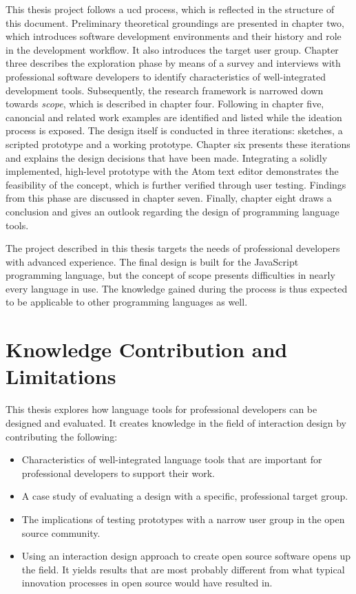 This thesis project follows a \ac{ucd} process, which is reflected in
the structure of this document. Preliminary theoretical groundings are
presented in chapter two, which introduces software development
environments and their history and role in the development workflow. It
also introduces the target user group. Chapter three describes the
exploration phase by means of a survey and interviews with professional
software developers to identify characteristics of well-integrated
development tools. Subsequently, the research framework is narrowed down
towards \emph{scope}, which is described in chapter four. Following in
chapter five, canoncial and related work examples are identified and
listed while the ideation process is exposed. The design itself is
conducted in three iterations: sketches, a scripted prototype and a
working prototype. Chapter six presents these iterations and explains
the design decisions that have been made. Integrating a solidly
implemented, high-level prototype with the Atom text editor demonstrates
the feasibility of the concept, which is further verified through user
testing. Findings from this phase are discussed in chapter seven.
Finally, chapter eight draws a conclusion and gives an outlook regarding
the design of programming language tools.

The project described in this thesis targets the needs of professional
developers with advanced experience. The final design is built for the
JavaScript programming language, but the concept of scope presents
difficulties in nearly every language in use. The knowledge gained
during the process is thus expected to be applicable to other
programming languages as well.

\section{Knowledge Contribution and
Limitations}\label{knowledge-contribution-and-limitations}

This thesis explores how language tools for professional developers can
be designed and evaluated. It creates knowledge in the field of
interaction design by contributing the following:

\begin{itemize}
\itemsep1pt\parskip0pt
\item
  Characteristics of well-integrated language tools that are important
  for professional developers to support their work.
\item
  A case study of evaluating a design with a specific, professional
  target group.
\item
  The implications of testing prototypes with a narrow user group in the
  open source community.
\item
  Using an interaction design approach to create open source software
  opens up the field. It yields results that are most probably different
  from what typical innovation processes in open source would have
  resulted in.
\end{itemize}

